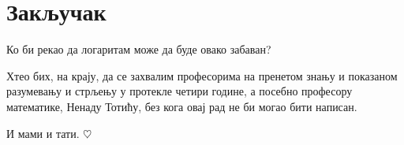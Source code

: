 \section{Закључак}

Ко би рекао да логаритам може да буде овако забаван?

\medskip

Хтео бих, на крају, да се захвалим професорима 
на пренетом знању и показаном разумевању и стрљењу у протекле четири године, 
а посебно професору математике, Ненаду Тотићу, 
без кога овај рад не би могао бити написан.

\medskip

И мами и тати. {\color{red}$\heartsuit$}

\bigskip



\clearpage
